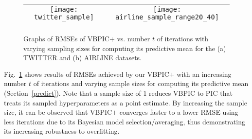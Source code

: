 \documentclass[conference]{IEEEtran}
\begin{document}
		\begin{figure}
			\begin{tabular}{cc}
				\hspace{-2.5mm}\texttt{[image: twitter\_sample]} &
				\hspace{-4mm}\texttt{[image: airline\_sample\_range20\_40]}\vspace{-1mm}\\
				\hspace{-2.5mm}{(a)} & \hspace{-4mm}{(b)}\vspace{-1mm}
			\end{tabular}
			\caption{Graphs of RMSEs of VBPIC$+$ vs. number $t$ of iterations with varying sampling sizes for computing its predictive mean for the (a) TWITTER and (b) AIRLINE datasets.}
			\label{fig5}%
		\end{figure}

Fig.~\ref{fig5} shows results of RMSEs achieved by our VBPIC$+$ with an increasing number $t$ of iterations and varying sample sizes for computing its predictive mean (Section~\ref{predict}).
Note that a sample size of $1$ reduces VBPIC to PIC that treats its sampled hyperparameters as a point estimate. By increasing the sample size, it can be observed that VBPIC$+$ converges faster to a lower RMSE using less iterations
due to its Bayesian model selection/averaging, thus demonstrating its increasing robustness to overfitting.
\end{document}

